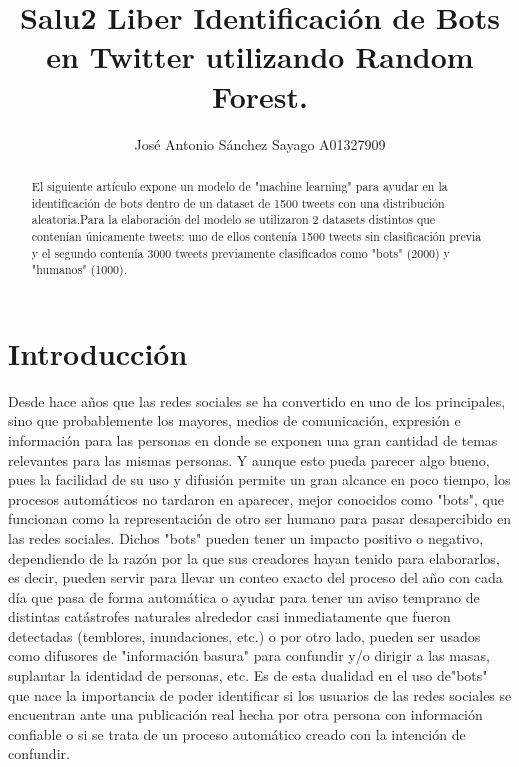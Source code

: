 \documentclass[runningheads]{llncs}
\begin{document}
%
\title{ Salu2 Liber Identificación de Bots en Twitter utilizando Random Forest.}
%
%
\author{José Antonio Sánchez Sayago A01327909}
%

%
%
\maketitle              %
%
\begin{abstract} 
El siguiente artículo expone un modelo de "machine learning" para ayudar en la identificación de bots dentro de un dataset de 1500 tweets con una distribución aleatoria.Para la elaboración del modelo se utilizaron 2 datasets distintos que contenían únicamente tweets: uno de ellos contenía 1500 tweets sin clasificación previa y el segundo contenía 3000 tweets previamente clasificados como "bots" (2000) y "humanos" (1000).

\end{abstract}
%
%
%
\section{Introducción}
Desde hace años que las redes sociales se ha convertido en uno de los principales, sino que probablemente los mayores, medios de comunicación, expresión e información para las personas en donde se exponen una gran cantidad de temas relevantes para las mismas personas. Y aunque esto pueda parecer algo bueno, pues la facilidad de su uso y difusión permite un gran alcance en poco tiempo, los procesos automáticos no tardaron en aparecer, mejor conocidos como "bots", que funcionan como la representación de otro ser humano para pasar desapercibido en las redes sociales. Dichos "bots" pueden tener un impacto positivo o negativo, dependiendo de la razón por la que sus creadores hayan tenido para elaborarlos, es decir, pueden servir para llevar un conteo exacto del proceso del año con cada día que pasa de forma automática o ayudar para tener un aviso temprano de distintas catástrofes naturales alrededor casi inmediatamente que fueron detectadas (temblores, inundaciones, etc.) o por otro lado, pueden ser usados como difusores de "información basura" para confundir y/o dirigir a las masas, suplantar la identidad de personas, etc.
Es de esta dualidad en el uso de"bots" que nace la importancia de poder identificar si los usuarios de las redes sociales se encuentran ante una publicación real hecha por otra persona con información confiable o si se trata de un proceso automático creado con la intención de confundir.
\end{document}
